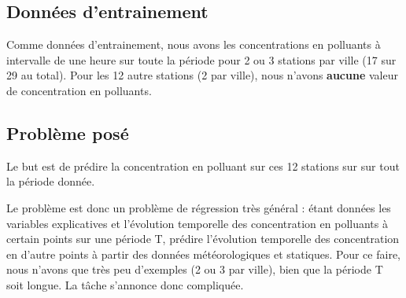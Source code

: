 \subsection{Données d'entrainement}

Comme données d'entrainement, nous avons les concentrations en polluants à intervalle de une heure sur toute la période pour 2 ou 3 stations par ville (17 sur 29 au total).
Pour les 12 autre stations (2 par ville), nous n'avons \textbf{aucune} valeur de concentration en polluants.

\subsection{Problème posé}

Le but est de prédire la concentration en polluant sur ces 12 stations sur sur tout la période donnée.

Le problème est donc un problème de régression très général : étant données les variables explicatives et l'évolution temporelle des concentration en polluants à certain points sur une période T, prédire l'évolution temporelle des concentration en d'autre points à partir des données météorologiques et statiques.
Pour ce faire, nous n'avons que très peu d'exemples (2 ou 3 par ville), bien que la période T soit longue.
La tâche s'annonce donc compliquée.

